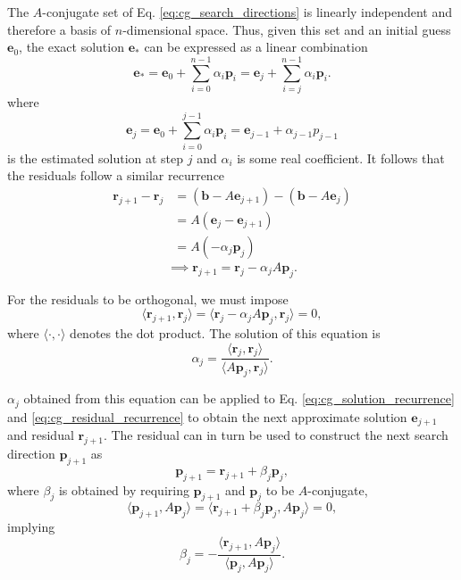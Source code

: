 \documentclass[utf8,english]{gradu3}
\begin{document}
The $A$-conjugate set of Eq. \eqref{eq:cg_search_directions}
is linearly independent and therefore a basis of $n$-dimensional space.
Thus, given this set and an initial guess $\mathbf{e}_0$,
the exact solution $\mathbf{e}_*$ can be expressed as a linear combination
\[
  \mathbf{e}_*
  = \mathbf{e}_0 + \sum_{i=0}^{n-1} \alpha_i \mathbf{p}_i
  = \mathbf{e}_j + \sum_{i=j}^{n-1} \alpha_i \mathbf{p}_i.
\]
where
\begin{equation}\label{eq:cg_solution_recurrence}
  \mathbf{e}_j = \mathbf{e}_0 + \sum_{i=0}^{j-1} \alpha_i \mathbf{p}_i
  = \mathbf{e}_{j-1} + \alpha_{j-1} p_{j-1}
\end{equation}
is the estimated solution at step $j$
and $\alpha_i$ is some real coefficient.
It follows that the residuals follow a similar recurrence
\begin{align*}
  \mathbf{r}_{j+1} - \mathbf{r}_j
    &= (\mathbf{b} - A\mathbf{e}_{j+1}) - (\mathbf{b} - A\mathbf{e}_j) \\
    &= A(\mathbf{e}_j - \mathbf{e}_{j+1}) \\
    &= A(-\alpha_j \mathbf{p}_j)
\end{align*}
\begin{equation}\label{eq:cg_residual_recurrence}
  \implies \mathbf{r}_{j+1} = \mathbf{r}_j - \alpha_j A\mathbf{p}_j.
\end{equation}

For the residuals to be orthogonal, we must impose
\[
  \langle \mathbf{r}_{j+1}, \mathbf{r}_j \rangle 
  = \langle \mathbf{r}_j - \alpha_j A\mathbf{p}_j, \mathbf{r}_j \rangle = 0,
\]
where $\langle \cdot, \cdot \rangle$ denotes the dot product.
The solution of this equation is
\begin{equation}\label{eq:cg_coef_alpha_first}
  \alpha_j = \frac{\langle \mathbf{r}_j, \mathbf{r}_j \rangle}
  {\langle A\mathbf{p}_j, \mathbf{r}_j \rangle}.
\end{equation}

$\alpha_j$ obtained from this equation can be applied to Eq.
\eqref{eq:cg_solution_recurrence} and \eqref{eq:cg_residual_recurrence}
to obtain the next approximate solution $\mathbf{e}_{j+1}$
and residual $\mathbf{r}_{j+1}$.
The residual can in turn be used to construct
the next search direction $\mathbf{p}_{j+1}$ as
\begin{equation}\label{eq:cg_search_dir_update}
  \mathbf{p}_{j+1} = \mathbf{r}_{j+1} + \beta_j \mathbf{p}_j,
\end{equation}
where $\beta_j$ is obtained by requiring $\mathbf{p}_{j+1}$
and $\mathbf{p}_j$ to be $A$-conjugate,
\[
  \langle \mathbf{p}_{j+1}, A\mathbf{p}_j \rangle
  = \langle \mathbf{r}_{j+1} + \beta_j \mathbf{p}_j, A\mathbf{p}_j \rangle
  = 0,
\]
implying
\begin{equation}\label{eq:cg_coef_beta_first}
  \beta_j = -\frac{\langle \mathbf{r}_{j+1}, A\mathbf{p}_j \rangle}
  {\langle \mathbf{p}_j, A\mathbf{p}_j \rangle}.
\end{equation}
\end{document}
